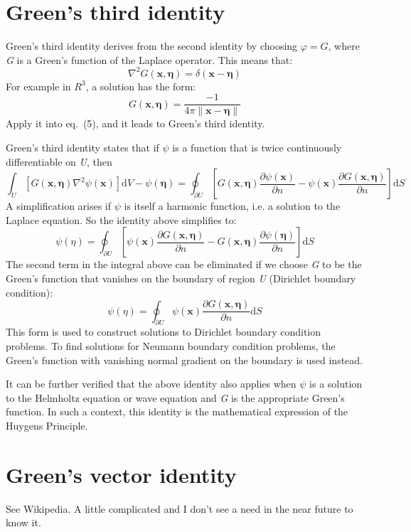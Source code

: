 \documentclass[a4paper]{article}
\begin{document}
\part{Green's third identity}
Green's third identity derives from the second identity by choosing $\varphi=G$, where \textit{G} is a Green's function of the Laplace operator. This means that:
\begin{equation}
\nabla^{2}G(\bm{x},\bm{\eta})=\delta(\bm{x}-\bm{\eta})
\end{equation}
For example in $R^{3}$, a solution has the form:
\begin{equation}
G(\bm{x},\bm{\eta})=\frac{-1}{4\pi\lVert \bm{x}-\bm{\eta} \rVert}
\end{equation}
Apply it into eq.~(5), and it leads to Green's third identity.

Green's third identity states that if $\psi$ is a function that is twice continuously differentiable on \textit{U}, then
\begin{equation}
\int_U \left[G\left(\bm{x},\bm{\eta}\right)\nabla^{2}\psi\left(\bm{x}\right)\right]\mathrm{d}V-\psi\left(\bm{\eta}\right)=\oint_{\partial U}\left[G\left(\bm{x},\bm{\eta}\right)\frac{\partial \psi\left(\bm{x}\right)}{\partial n}-\psi\left(\bm{x}\right)\frac{\partial G\left(\bm{x},\bm{\eta}\right)}{\partial n}\right]\mathrm{d}S
\end{equation}
A simplification arises if $\psi$ is itself a harmonic function, i.e. a solution to the Laplace equation. So the identity above simplifies to:
\begin{equation}
\psi\left(\eta\right)=\oint_{\partial U}\left[\psi\left(\bm{x}\right)\frac{\partial G\left(\bm{x},\bm{\eta}\right)}{\partial n}-G\left(\bm{x},\bm{\eta}\right)\frac{\partial \psi\left(\bm{\eta}\right)}{\partial n}\right]\mathrm{d}S
\end{equation}
The second term in the integral above can be eliminated if we choose \textit{G} to be the Green's function that vanishes on the boundary of region \textit{U} (Dirichlet boundary condition):
\begin{equation}
\psi\left(\eta\right)=\oint_{\partial U}\psi\left(\bm{x}\right)\frac{\partial G\left(\bm{x},\bm{\eta}\right)}{\partial n}\mathrm{d}S
\end{equation}
This form is used to construct solutions to Dirichlet boundary condition problems. To find solutions for Neumann boundary condition problems, the Green's function with vanishing normal gradient on the boundary is used instead.

It can be further verified that the above identity also applies when $\psi$ is a solution to the Helmholtz equation or wave equation and \textit{G} is the appropriate Green's function. In such a context, this identity is the mathematical expression of the Huygens Principle.
\part{Green's vector identity}
See Wikipedia. A little complicated and I don't see a need in the near future to know it.
\end{document}
